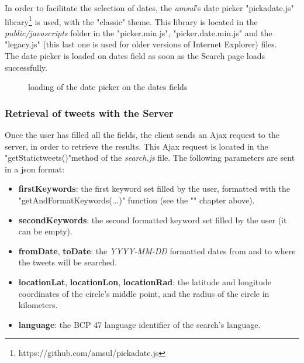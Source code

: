 \documentclass[a4paper,11pt]{report}
\begin{document}
In order to facilitate the selection of dates, the \emph{amsul}'s date picker "pickadate.js" library\footnote{https://github.com/amsul/pickadate.js} is used, with the "classic" theme. This library is located in the \emph{public/javascripts} folder in the "picker.min.js", "picker.date.min.js" and the "legacy.js" (this last one is used for older versions of Internet Explorer) files.\\

The date picker is loaded on dates field as soon as the Search page loads successfully.
\begin{figure}[H]
\vspace{-5pt}
\begin{center}
\vspace{-5pt}
\caption{loading of the date picker on the dates fields}
\end{center}
\end{figure}
\vspace{-10pt}
\newpage

\subsubsection{Retrieval of tweets with the Server}
\label{retrievalOftweets}
Once the user has filled all the fields, the client sends an Ajax request to the server, in order to retrieve the results. This Ajax request is located in the "getStatictweets()"method of the \emph{search.js} file. The following parameters are sent in a json format:
\begin{itemize}
	\item \textbf{firstKeywords}: the first keyword set filled by the user, formatted with the "getAndFormatKeywords(...)" function (see the "" chapter above).
	\item \textbf{secondKeywords}: the second formatted keyword set filled by the user (it can be empty).
	\item \textbf{fromDate}, \textbf{toDate}: the \emph{YYYY-MM-DD} formatted dates from and to where the tweets will be searched.
	\item \textbf{locationLat}, \textbf{locationLon}, \textbf{locationRad}: the latitude and longitude coordinates of the circle's middle point, and the radius of the circle in kilometers.
	\item \textbf{language}: the BCP 47 language identifier of the search's language.
\end{itemize}
\end{document}
